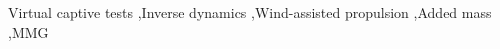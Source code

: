 \documentclass[preprint,11pt,authoryear]{elsarticle}
\begin{document}
\begin{frontmatter}

    \begin{abstract}
        

    \end{abstract}


    \begin{keyword}
    Virtual captive tests \sep Inverse dynamics \sep Wind-assisted propulsion \sep Added mass \sep MMG 



    \end{keyword}

\end{frontmatter}
\FloatBarrier
\end{document}
